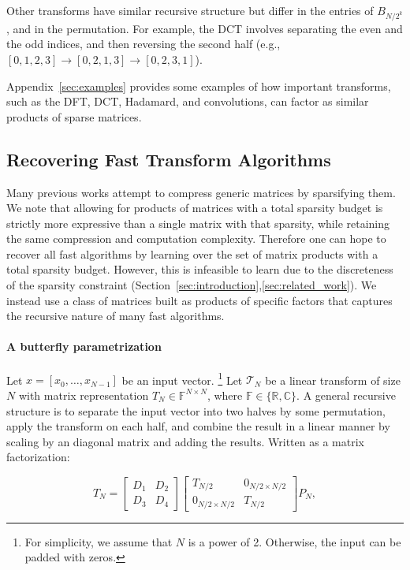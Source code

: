 Other transforms have similar recursive structure but differ in the entries of $B_{N/2^k}$, and in the permutation. For example, the DCT involves separating the even and the odd indices, and then reversing the second half (e.g., $[0, 1, 2, 3] \to [0, 2, 1, 3] \to [0, 2, 3, 1]$).

Appendix~\ref{sec:examples} provides some examples of how important transforms, such as the DFT, DCT, Hadamard, and convolutions, can factor as similar products of sparse matrices.

\subsection{Recovering Fast Transform Algorithms}
\label{sec:fast_transforms}

Many previous works attempt to compress generic matrices by sparsifying them. We note that allowing for products of matrices with a total sparsity budget is strictly more expressive than a single matrix with that sparsity, while retaining the same compression and computation complexity. Therefore one can hope to recover all fast algorithms by learning over the set of matrix products with a total sparsity budget. However, this is infeasible to learn due to the discreteness of the sparsity constraint (Section~\ref{sec:introduction},\ref{sec:related_work}).
We instead use a class of matrices built as products of specific factors that captures the recursive nature of many fast algorithms.

\paragraph{A butterfly parametrization}

Let $x = [x_0, \dots, x_{N-1}]$ be an input vector.
\footnote{For simplicity, we assume that $N$ is a power of 2. Otherwise, the input can be padded with zeros.} Let $\mathcal{T}_N$ be a linear transform of size $N$ with matrix representation $T_N \in \mathbb{F}^{N \times N}$, where $\mathbb{F} \in \{\mathbb{R},\mathbb{C}\}$.
A general recursive structure is to separate the input vector into two halves by some permutation, apply the transform on each half, and combine the result in a linear manner by scaling by an diagonal matrix and adding the results. Written as a matrix factorization:

\begin{equation*}
  T_N = \begin{bmatrix} D_1 & D_2 \\ D_3 & D_4 \end{bmatrix} \begin{bmatrix} T_{N/2} & 0_{N/2\times N/2} \\ 0_{N/2 \times N/2} & T_{N/2} \end{bmatrix} P_{N},
\end{equation*}

